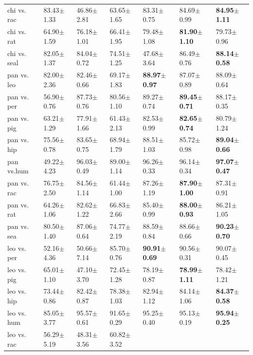 \documentclass[twoside,zihao=-4,UTF8]{bjfu}
\begin{document}
{\begin{flushleft}
\begin{longtable}[h]{p{55pt}p{50pt}p{50pt}p{50pt}p{50pt}p{50pt}p{50pt}}
		chi vs. rac & 83.43$\pm$1.33 & 46.86$\pm$2.81 & 63.65$\pm$1.65 & 
		83.31$\pm$0.75 & 84.69$\pm$0.99 & \textbf{84.95$\pm$1.11} \\
		chi vs. rat & 64.90$\pm$1.59 & 76.18$\pm$1.01 & 66.41$\pm$1.95 & 
		79.48$\pm$1.08 & \textbf{81.90$\pm$1.10} & 79.73$\pm$0.96 \\
		chi vs. seal & 82.05$\pm$1.37 & 84.04$\pm$0.72 & 74.51$\pm$1.25 & 
		47.68$\pm$3.64 & 86.49$\pm$0.76 & \textbf{88.14$\pm$0.58} \\
		pan vs. leo & 82.00$\pm$2.36 & 82.46$\pm$0.66 & 69.17$\pm$1.83 & 
		\textbf{88.97$\pm$0.97} & 87.07$\pm$0.89 & 88.09$\pm$0.64 \\
		pan vs. per & 56.90$\pm$0.76 & 87.73$\pm$0.76 & 80.56$\pm$1.10 & 
		89.27$\pm$0.74 & \textbf{89.45$\pm$0.71} & 88.17$\pm$0.35 \\
		pan vs. pig & 63.21$\pm$1.29 & 77.91$\pm$1.66 & 61.43$\pm$2.13 & 
		82.53$\pm$0.99 & \textbf{82.65$\pm$0.74} & 80.79$\pm$1.24 \\
		pan vs. hip & 75.56$\pm$0.78 & 83.65$\pm$0.75 & 68.94$\pm$1.79 & 
		88.51$\pm$1.03 & 85.72$\pm$0.98 & \textbf{89.04$\pm$0.66} \\
		pan vs.hum & 49.22$\pm$4.23 & 96.03$\pm$0.49 & 89.00$\pm$1.14 & 
		96.26$\pm$0.33 & 96.14$\pm$0.34 & \textbf{97.07$\pm$0.47} \\
		pan vs. rac & 76.75$\pm$2.50 & 84.56$\pm$1.14 & 61.44$\pm$1.00 & 
		87.26$\pm$1.19 & \textbf{87.90$\pm$1.00} & 87.31$\pm$0.91 \\
		pan vs. rat & 64.26$\pm$1.06 & 82.62$\pm$1.22 & 66.83$\pm$2.66 & 
		85.40$\pm$0.99 & \textbf{88.00$\pm$0.93} & 86.21$\pm$1.05 \\
		pan vs. sea & 80.50$\pm$1.40 & 87.06$\pm$0.64 & 74.77$\pm$2.19 & 
		88.59$\pm$0.84 & 88.66$\pm$0.66 & \textbf{90.23$\pm$0.70} \\
		leo vs. per & 52.16$\pm$4.36 & 50.66$\pm$7.14 & 85.70$\pm$0.76 & 
		\textbf{90.91$\pm$0.69} & 90.56$\pm$0.31 & 90.07$\pm$0.45 \\
		leo vs. pig & 65.01$\pm$1.10 & 47.10$\pm$3.70 & 72.45$\pm$1.28 & 
		78.19$\pm$0.87 & \textbf{78.99$\pm$1.11} & 78.42$\pm$1.21 \\
		leo vs. hip & 73.44$\pm$0.86 & 82.42$\pm$0.87 & 78.38$\pm$1.03 & 
		82.94$\pm$1.12 & 84.14$\pm$1.06 & \textbf{84.37$\pm$0.58} \\
		leo vs. hum & 85.05$\pm$3.77 & 95.57$\pm$0.61 & 91.65$\pm$0.29 & 
		95.25$\pm$0.40 & 95.13$\pm$0.19 & \textbf{95.94$\pm$0.25} \\
		leo vs. rac & 56.29$\pm$5.19 & 48.31$\pm$3.56 & 60.82$\pm$3.52 & 

\end{longtable}
\end{flushleft}}
\end{document}
